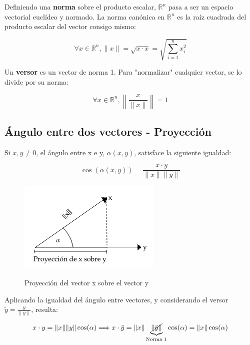 \documentclass{article}
\renewcommand{\Bbb}{\mathbb}
\begin{document}
Definiendo una \textbf{norma} sobre el producto escalar, $\Bbb R^n$ pasa a ser un espacio vectorial euclídeo y normado. La norma canónica en $\Bbb R^n$ es la raíz cuadrada del producto escalar del vector consigo mismo:

\begin{equation}
\forall x \in \Bbb R^n, \|x\| = \sqrt{x \cdot x} = \sqrt{ \sum_{i=1}^{n} x_i^2 }
\end{equation}

Un \textbf{versor} es un vector de norma 1. Para "normalizar" cualquier vector, se lo divide por su norma:

\begin{equation}
\forall x \in \Bbb R^n, \left\| \frac{x}{\|x\|} \right\| = 1
\end{equation}

\subsection{Ángulo entre dos vectores - Proyección}

Si $x, y \neq \overline{0}$, el ángulo entre x e y, $\alpha(x,y)$, satisface la siguiente igualdad:

\begin{equation}
\cos (\alpha(x, y)) = \frac{x \cdot y}{ \|x\| \|y\| }
\end{equation}

\begin{figure}[t]
\caption{Proyección del vector x sobre el vector y}
\includegraphics[scale=1]{img/teo_fig001_proyeccion.png} 
\centering
\label{fig:proyeccion}
\end{figure}

Aplicando la igualdad del ángulo entre vectores, y considerando el versor $\breve{y} = \frac{y}{\|y\|}$, resulta:

\begin{equation}
x \cdot y = \|x\| \|y\| \cos(\alpha) \Longrightarrow x \cdot \breve{y} = \|x\| \underbrace{ \cancel{ \| \breve{y} \| } }_{\text{Norma 1}} \cos(\alpha) = \|x\| \cos(\alpha)
\end{equation}
\end{document}
